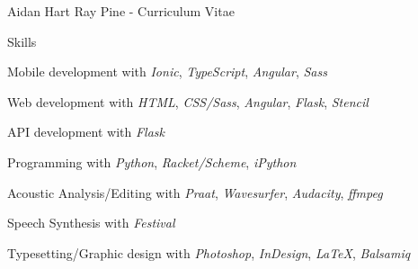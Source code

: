 \documentclass[12pt]{letter}
\begin{document}
\begin{cv}{ Aidan Hart Ray Pine  \space - \space   Curriculum Vitae}
         \begin{cvlist}{Skills}
                        \item Mobile development with  \textit{Ionic},  \textit{TypeScript},  \textit{Angular},  \textit{Sass}                         \item Web development with  \textit{HTML},  \textit{CSS/Sass},  \textit{Angular},  \textit{Flask},  \textit{Stencil}                         \item API development with  \textit{Flask}                         \item Programming with  \textit{Python},  \textit{Racket/Scheme},  \textit{iPython}                         \item Acoustic Analysis/Editing with  \textit{Praat},  \textit{Wavesurfer},  \textit{Audacity},  \textit{ffmpeg}                         \item Speech Synthesis with  \textit{Festival}                         \item Typesetting/Graphic design with  \textit{Photoshop},  \textit{InDesign},  \textit{\LaTeX},  \textit{Balsamiq}                      \end{cvlist}


\end{cv}
\end{document}
